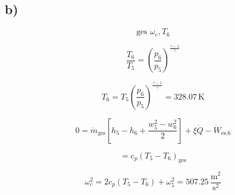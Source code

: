

\subsection*{b)}

\[
\text{ges } \omega_c, T_6
\]

\[
\frac{T_6}{T_5} = \left( \frac{p_6}{p_5} \right)^{\frac{\gamma-1}{\gamma}}
\]

\[
T_6 = T_5 \left( \frac{p_6}{p_5} \right)^{\frac{\gamma-1}{\gamma}} = 328.07 \, \text{K}
\]

\[
0 = \dot{m}_{\text{ges}} \left[ h_5 - h_6 + \frac{w_5^2 - w_6^2}{2} \right] + \xi \dot{Q} - \dot{W}_{\text{es,6}}
\]

\[
= c_p \left( T_5 - T_6 \right)_{\text{ges}}
\]

\[
\omega_c^2 = 2 c_p (T_5 - T_6) + \omega_5^2 = 507.25 \, \frac{\text{m}^2}{\text{s}^2}
\]